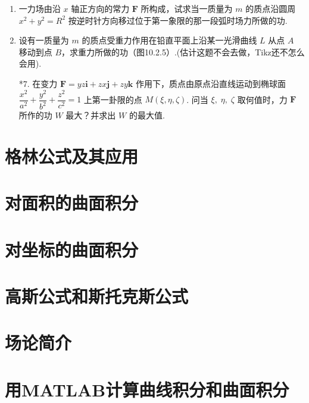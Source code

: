 \begin{enumerate}
    \item 一力场由沿 $x$ 轴正方向的常力 $\boldsymbol{F}$ 所构成，试求当一质量为 $m$ 的质点沿圆周 $x^2+y^2=R^2$ 按逆时针方向移过位于第一象限的那一段弧时场力所做的功.
    
    \item 设有一质量为 $m$ 的质点受重力作用在铅直平面上沿某一光滑曲线 $L$ 从点 $A$ 移动到点 $B$，求重力所做的功（图10.2.5）.(估计这题不会去做，Tikz还不怎么会用).
    
    \item[*7.] 在变力 $\boldsymbol{F}=yz\boldsymbol{i}+zx\boldsymbol{j}+zy\boldsymbol{k}$ 作用下，质点由原点沿直线运动到椭球面 $\dfrac{x^2}{a^2}+\dfrac{y^2}{b^2}+\dfrac{z^2}{c^2}=1$ 上第一卦限的点 $M(\xi, \eta, \zeta)$. 
    问当 $\xi,\;\eta,\;\zeta$ 取何值时，力 $\boldsymbol{F}$ 所作的功 $W$ 最大？并求出 $W$ 的最大值.
\end{enumerate}

\section{格林公式及其应用}

\section{对面积的曲面积分}

\section{对坐标的曲面积分}

\section{高斯公式和斯托克斯公式}

\section{场论简介}

\section{用MATLAB计算曲线积分和曲面积分}